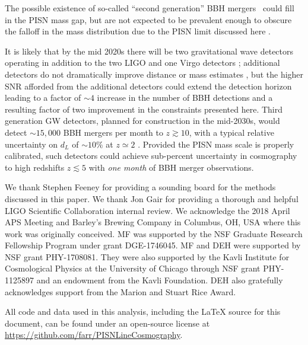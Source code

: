 \documentclass[modern]{aastex62}
\begin{document}
The possible existence of so-called ``second generation'' \ac{BBH} mergers~\citep[mergers where one black hole is itself a merger product, see e.g.][]{2017ApJ...840L..24F} could fill in the
\ac{PISN} mass gap, but are not expected to be prevalent enough to obscure the
falloff in the mass distribution due to the \ac{PISN} limit discussed here
\citep{Rodriguez2019}.

It is likely that by the mid 2020s there will be two gravitational wave
detectors operating in addition to the two LIGO and one Virgo detectors
\citep{ObsScenarios}; additional detectors do not dramatically improve distance
or mass estimates \citep{Vitale2017}, but the higher SNR afforded from the
additional detectors could extend the detection horizon leading to a factor of
$\sim 4$ increase in the number of \ac{BBH} detections and a resulting factor of
two improvement in the constraints presented here.  Third generation \ac{GW}
detectors, planned for construction in the mid-2030s, would detect $\sim 15,000$
\ac{BBH} mergers per month to $z \gtrsim 10$, with a typical relative
uncertainty on $d_L$ of $\sim 10 \%$ at $z \simeq 2$ \citep{Vitale2018}.
Provided the \ac{PISN} mass scale is properly calibrated, such detectors could
achieve sub-percent uncertainty in cosmography to high redshifts $z \lesssim 5$
with \emph{one month} of \ac{BBH} merger observations.

\acknowledgments

We thank Stephen Feeney for providing a sounding board for the methods discussed
in this paper.  We thank Jon Gair for providing a thorough and helpful LIGO
Scientific Collaboration internal review.  We acknowledge the 2018 April APS
Meeting and Barley's Brewing Company in Columbus, OH, USA where this work was
originally conceived. MF was supported by the NSF Graduate Research Fellowship Program under grant DGE-1746045. MF and DEH were supported by  NSF grant PHY-1708081. They were also supported by the Kavli Institute for Cosmological Physics at the University of Chicago through NSF grant PHY-1125897 and an endowment from the Kavli Foundation. DEH also gratefully acknowledges support from the Marion and Stuart Rice Award.

All code and data used in this analysis, including the \LaTeX{} source for this
document, can be found under an open-source license at
\url{https://github.com/farr/PISNLineCosmography}.

\end{document}
